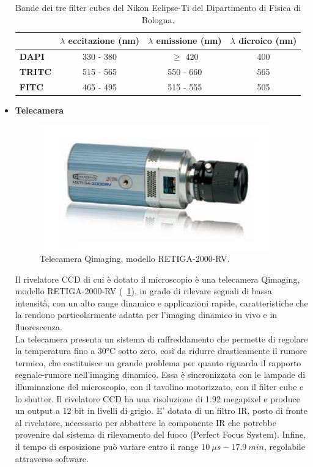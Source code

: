 \begin{itemize}
\begin{table}[!ht]
 \begin{center}
\begin{small}
\begin{tabular}{lccc}
\hline\hline
&\textbf{$\lambda$ eccitazione (nm)}&\textbf{$\lambda$ emissione (nm)}&\textbf{$\lambda$ dicroico (nm)}\\
\hline
\textbf{DAPI}&330 - 380&$\geq$ 420&400\\
\textbf{TRITC}&515 - 565&550 - 660&565\\
\textbf{FITC}&465 - 495&515 - 555&505\\
\hline\hline
\end{tabular}
\caption{\small{Bande dei tre filter cubes del Nikon Eclipse-Ti del Dipartimento di Fisica di Bologna.}}
\label{TAB}
\end{small}
\end{center}
\end{table}

\item \textbf{Telecamera}\\

\begin{figure}
 \centering
 \includegraphics[scale=.40]{img/CAP2CCD.png}
 \caption{\small{Telecamera Qimaging, modello RETIGA-2000-RV.}}
 \label{fig:CCD}
\end{figure}

Il rivelatore CCD di cui è dotato il microscopio è una telecamera Qimaging, modello RETIGA-2000-RV (\figurename~\ref{fig:CCD}), in grado di rilevare segnali di bassa intensità, con un alto range dinamico e applicazioni rapide, caratteristiche che la rendono particolarmente adatta per l'imaging dinamico in vivo e in fluorescenza.\\
La telecamera presenta un sistema di raffreddamento che permette di regolare la temperatura fino a 30°C sotto zero, così da ridurre drasticamente il rumore termico, che costituisce un grande problema per quanto riguarda il rapporto segnale-rumore nell'imaging dinamico.
Essa è sincronizzata con le lampade di illuminazione del microscopio, con il tavolino motorizzato, con il filter cube e lo shutter. 
Il rivelatore CCD ha una risoluzione di 1.92 megapixel e produce un output a 12 bit in livelli di grigio.
E' dotata di un filtro IR, posto di fronte al rivelatore, necessario per abbattere la componente IR che potrebbe provenire dal sistema di rilevamento del fuoco (Perfect Focus System). 
Infine, il tempo di esposizione può variare entro il range $10\ \mu s - 17.9\ min $, regolabile attraverso software.


\end{itemize}
